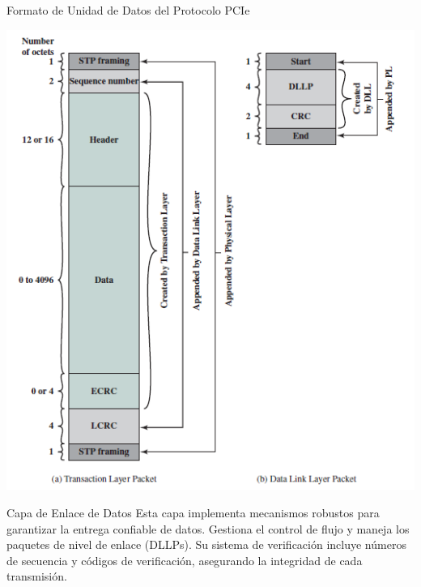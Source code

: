 \documentclass[presentation]{beamer}
\begin{document}
\begin{frame}[label={sec:org162c825}]{Formato de Unidad de Datos del Protocolo PCIe}
\begin{center}
\includegraphics[width=.9\linewidth]{./Images/formato.png}
\end{center}
\end{frame}

\begin{frame}[label={sec:org6fa3c08}]{Capa de Enlace de Datos}
Esta capa implementa mecanismos robustos para garantizar la entrega confiable de datos. Gestiona el control de flujo y maneja los paquetes de nivel de enlace (DLLPs). Su sistema de verificación incluye números de secuencia y códigos de verificación, asegurando la integridad de cada transmisión.
\end{frame}
\end{document}
